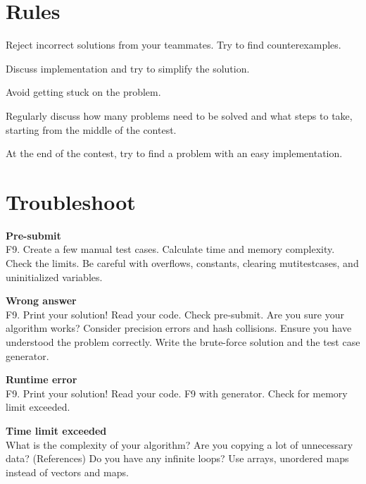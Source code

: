 \section{Rules}
Reject incorrect solutions from your teammates. Try to find counterexamples.

Discuss implementation and try to simplify the solution.

Avoid getting stuck on the problem.

Regularly discuss how many problems need to be solved and what steps to take, starting from the middle of the contest.

At the end of the contest, try to find a problem with an easy implementation.

\section{Troubleshoot}
\textbf{Pre-submit}\\
F9.
Create a few manual test cases.
Calculate time and memory complexity. Check the limits.
Be careful with overflows, constants,
clearing mutitestcases, and uninitialized variables.

\textbf{Wrong answer}\\
F9.
Print your solution!
Read your code.
Check pre-submit.
Are you sure your algorithm works?
Consider precision errors and hash collisions.
Ensure you have understood the problem correctly.
Write the brute-force solution and the test case generator.

\textbf{Runtime error}\\
F9.
Print your solution!
Read your code.
F9 with generator.
Check for memory limit exceeded.

\textbf{Time limit exceeded}\\
What is the complexity of your algorithm?
Are you copying a lot of unnecessary data? (References)
Do you have any infinite loops?
Use arrays, unordered maps instead of vectors and maps.
